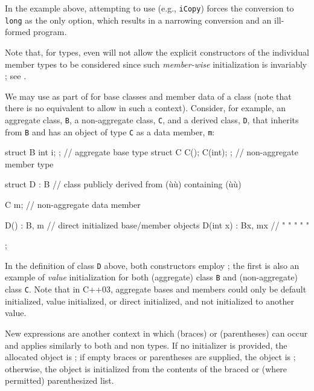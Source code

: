\noindent In the example above, attempting to use  (e.g., \lstinline!iCopy!) forces the conversion to
\lstinline!long! as the only option, which results in a narrowing
conversion and an ill-formed program.

Note that, for  types, even  will not allow the explicit constructors of the
individual member types to be considered since such \emph{member-wise}
initialization is invariably ; see
.

We may use  as part of  for base classes and member data of a class (note
that there is no equivalent to allow 
in such a context). Consider, for example, an aggregate class,
\lstinline!B!, a non-aggregate class, \lstinline!C!, and a derived class,
\lstinline!D!, that inherits from \lstinline!B! and has an object of type
\lstinline!C! as a data member, \lstinline!m!:

\begin{emcppslisting}
struct B { int i; };        // aggregate base type
struct C { C(); C(int); };  // non-aggregate member type

struct D : B  // class publicly derived from (ù{}ù) containing (ù{}ù)
{
    C m;  // non-aggregate data member

    D()      : B{},  m{}  { }  // direct initialized base/member objects
    D(int x) : B{x}, m{x} { }  //    "       "        "     "       "
};
\end{emcppslisting}
    

\noindent In the definition of class \lstinline!D! above, both constructors employ
; the first is also an example of
\emph{value} initialization for both (aggregate) class \lstinline!B! and
(non-aggregate) class \lstinline!C!. Note that in C++03, aggregate bases
and members could only be default initialized, value initialized, or
direct initialized, and not initialized to another value.

New expressions are another context in which  (braces) or  (parentheses)
can occur and applies similarly to both  and
non types. If no initializer is provided, the
allocated object is ; if empty braces or
parentheses are supplied, the object is ;
otherwise, the object is initialized from the contents of the braced or
(where permitted) parenthesized list.

